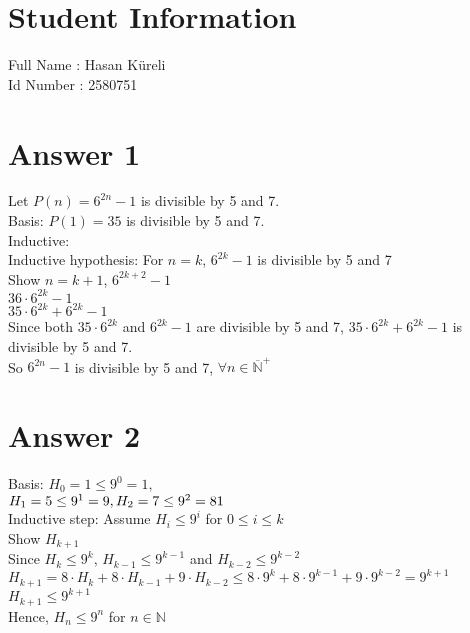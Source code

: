\documentclass[12pt]{article}
\begin{document}
\section*{Student Information }
Full Name : Hasan Küreli  \\
Id Number :  2580751\\

\section*{Answer 1}
Let $P(n) = 6^{2n}-1$ is divisible by 5 and 7.\\
Basis: $P(1) = 35$ is divisible by 5 and 7.\\
Inductive: \\
Inductive hypothesis: For $n=k$, $6^{2k}-1$ is divisible by 5 and 7 \\
Show $n=k+1$, $6^{2k+2} -1$ \\
$36 \cdot 6^{2k} -1$ \\
$35 \cdot 6^{2k} + 6^{2k} -1$ \\
Since both $35 \cdot 6^{2k}$ and $6^{2k} -1$ are divisible by 5 and 7, $35 \cdot 6^{2k} + 6^{2k} -1$ is divisible by 5 and 7. \\
So $6^{2n}-1$ is divisible by 5 and 7, $\forall n \in \overline{\mathbb{N}}^{+}$

\section*{Answer 2}

Basis: $H_0 = 1 \le 9^0 =1,$ \\$H_1 = 5 \le 9^1 =9,\\ H_2 = 7\le 9^2 = 81$\\
Inductive step: Assume $H_i \le 9^i$ for $0 \le i \le k$\\
Show $H_{k+1}$\\
Since $H_k \le 9^k$, $H_{k-1} \le 9^{k-1}$ and $H_{k-2} \le 9^{k-2}$\\ 
$H_{k+1} = 8\cdot H_{k} +8\cdot H_{k-1} + 9 \cdot H_{k-2} \le 8\cdot 9^{k} + 8\cdot 9^{k-1} +9\cdot 9^{k-2} = 9^{k+1}$\\
$H_{k+1} \le 9^{k+1}$\\
Hence, $H_n \le 9^n$ for $n \in \mathbb{N}$
\end{document}
